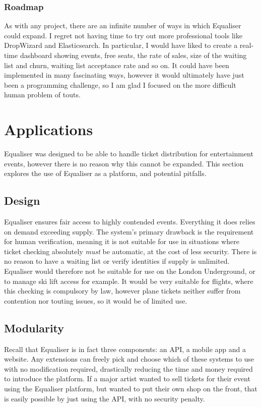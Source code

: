 \documentclass[12pt,a4paper]{bhamdissertation}
\begin{document}
\subsection{Roadmap}

As with any project, there are an infinite number of ways in which Equaliser could expand. I regret not having time to try out more professional tools like DropWizard and Elasticsearch. In particular, I would have liked to create a real-time dashboard showing events, free seats, the rate of sales, size of the waiting list and churn, waiting list acceptance rate and so on. It could have been implemented in many fascinating ways, however it would ultimately have just been a programming challenge, so I am glad I focused on the more difficult human problem of touts.

\chapter{Applications} \label{applications}

Equaliser was designed to be able to handle ticket distribution for entertainment events, however there is no reason why this cannot be expanded. This section explores the use of Equaliser as a platform, and potential pitfalls.

\section{Design}

Equaliser ensures fair access to highly contended events. Everything it does relies on demand exceeding supply. The system's primary drawback is the requirement for human verification, meaning it is not suitable for use in situations where ticket checking absolutely \textit{must} be automatic, at the cost of less security. There is no reason to have a waiting list or verify identities if supply is unlimited. Equaliser would therefore not be suitable for use on the London Underground, or to manage ski lift access for example. It would be very suitable for flights, where this checking is compulsory by law, however plane tickets neither suffer from contention nor touting issues, so it would be of limited use.

\section{Modularity}

Recall that Equaliser is in fact three components: an API, a mobile app and a website. Any extensions can freely pick and choose which of these systems to use with no modification required, drastically reducing the time and money required to introduce the platform. If a major artist wanted to sell tickets for their event using the Equaliser platform, but wanted to put their own shop on the front, that is easily possible by just using the API, with no security penalty.
\end{document}

